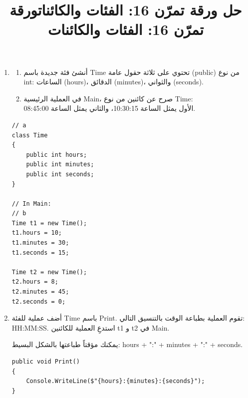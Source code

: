 \documentclass[14pt]{extarticle}
\title{حل ورقة تمرّن 16: الفئات والكائنات}
\title{ورقة تمرّن 16: الفئات والكائنات}
\begin{document}
\maketitle
\thispagestyle{fancy}

\begin{enumerate}[itemsep=2em]
    \item
    \begin{enumerate}
        \item أنشئ فئة جديدة باسم \textenglish{Time} تحتوي على ثلاثة حقول عامة (\textenglish{public}) من نوع \textenglish{int}: الساعات (\textenglish{hours})، الدقائق (\textenglish{minutes})، والثواني (\textenglish{seconds}).
        \item في العملية الرئيسية \textenglish{Main}، صرح عن كائنين من نوع \textenglish{Time}: \\
         الأول يمثل الساعة 10:30:15، والثاني يمثل الساعة 08:45:00.
    \end{enumerate}

    \ifwithsols
    \begin{boxSolution}
    \begin{english}
    \begin{verbatim}
// a
class Time
{
    public int hours;
    public int minutes;
    public int seconds;
}

// In Main:
// b
Time t1 = new Time();
t1.hours = 10;
t1.minutes = 30;
t1.seconds = 15;

Time t2 = new Time();
t2.hours = 8;
t2.minutes = 45;
t2.seconds = 0;
    \end{verbatim}
    \end{english}
    \end{boxSolution}
    \clearpage
    \fi

    \item
    أضف عملية للفئة \textenglish{Time} باسم \textenglish{Print}. تقوم العملية بطباعة الوقت بالتنسيق التالي: \\
     \textenglish{HH:MM:SS}.
    استدعِ العملية للكائنين \textenglish{t1} و \textenglish{t2} في \textenglish{Main}.
    \begin{boxHint}
    يمكنك مؤقتاً طباعتها بالشكل البسيط: \textenglish{hours + ":" + minutes + ":" + seconds}.
    \end{boxHint}

    \ifwithsols
    \begin{boxSolution}
    \begin{english}
    \begin{verbatim}
public void Print()
{
    Console.WriteLine($"{hours}:{minutes}:{seconds}");
}


\end{verbatim}
\end{english}
\end{boxSolution}
\end{enumerate}
\end{document}
